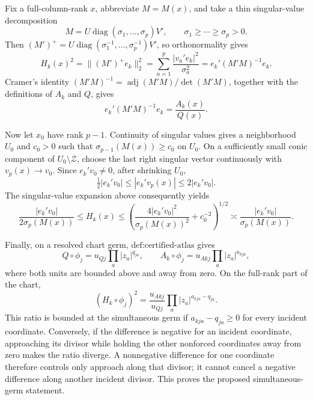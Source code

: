 Fix a full-column-rank \(x\), abbreviate \(M=M(x)\), and take a thin singular-value decomposition
\[
M=U\operatorname{diag}(\sigma _1,\ldots,\sigma _p)V',
\qquad \sigma _1\ge\cdots\ge\sigma _p>0.
\]
Then \((M')^+=U\operatorname{diag}(\sigma _1^{-1},\ldots,\sigma _p^{-1})V'\), so orthonormality gives
\[
H_k(x)^2=\|(M')^+e_k\|_2^2
=\sum_{a=1}^p\frac{|v_a'e_k|^2}{\sigma _a^2}
=e_k'(M'M)^{-1}e_k.
\]
Cramer's identity \((M'M)^{-1}=\operatorname{adj}(M'M)/\det(M'M)\), together with the definitions of \(A_k\) and \(Q\), gives
\[
e_k'(M'M)^{-1}e_k=\frac{A_k(x)}{Q(x)}.
\]

Now let \(x_0\) have rank \(p-1\). Continuity of singular values gives a neighborhood \(U_0\) and \(c_0>0\) such that \(\sigma_{p-1}(M(x))\ge c_0\) on \(U_0\). On a sufficiently small conic component of \(U_0\setminus\mathcal Z\), choose the last right singular vector continuously with \(v_p(x)\to v_0\). Since \(e_k'v_0\ne0\), after shrinking \(U_0\),
\[
\tfrac12|e_k'v_0|\le |e_k'v_p(x)|\le 2|e_k'v_0|.
\]
The singular-value expansion above consequently yields
\[
\frac{|e_k'v_0|}{2\sigma_p(M(x))}
\le H_k(x)
\le \left(\frac{4|e_k'v_0|^2}{\sigma_p(M(x))^2}+c_0^{-2}\right)^{1/2}
\asymp \frac{|e_k'v_0|}{\sigma_p(M(x))}.
\]

Finally, on a resolved chart germ, \(\text{def:certified-atlas}\) gives
\[
Q\circ\phi_j=u_{Qj}\prod_a|z_a|^{q_{ja}},
\qquad
A_k\circ\phi_j=u_{Akj}\prod_a|z_a|^{a_{kja}},
\]
where both units are bounded above and away from zero. On the full-rank part of the chart,
\[
(H_k\circ\phi_j)^2
=\frac{u_{Akj}}{u_{Qj}}\prod_a|z_a|^{a_{kja}-q_{ja}}.
\]
This ratio is bounded at the simultaneous germ if \(a_{kja}-q_{ja}\ge0\) for every incident coordinate. Conversely, if the difference is negative for an incident coordinate, approaching its divisor while holding the other nonforced coordinates away from zero makes the ratio diverge. A nonnegative difference for one coordinate therefore controls only approach along that divisor; it cannot cancel a negative difference along another incident divisor. This proves the proposed simultaneous-germ statement.